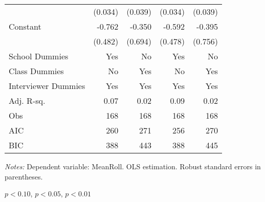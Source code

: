 \begin{table}[htbp]
\begin{threeparttable}
\begin{tabular}{l*{4}{D{.}{.}{-1}}}
                    &             (0.034)   &             (0.039)   &             (0.034)   &             (0.039)   \\
Constant            &              -0.762   &              -0.350   &              -0.592   &              -0.395   \\
                    &             (0.482)   &             (0.694)   &             (0.478)   &             (0.756)   \\
School Dummies      &                 Yes   &                  No   &                 Yes   &                  No   \\
Class Dummies       &                  No   &                 Yes   &                  No   &                 Yes   \\
Interviewer Dummies &                 Yes   &                 Yes   &                 Yes   &                 Yes   \\
\midrule
Adj. R-sq.          &                0.07   &                0.02   &                0.09   &                0.02   \\
Obs                 &                 168   &                 168   &                 168   &                 168   \\
AIC                 &                 260   &                 271   &                 256   &                 270   \\
BIC                 &                 388   &                 443   &                 388   &                 445   \\
\bottomrule
\end{tabular}
\begin{tablenotes}
\footnotesize
\item \textit{Notes:} Dependent variable: MeanRoll. OLS estimation. Robust standard errors in parentheses.
\item \sym{*} \(p<0.10\), \sym{**} \(p<0.05\), \sym{***} \(p<0.01\)
\end{tablenotes}
\end{threeparttable}
\label{tab:cheat_math}
\end{table}
